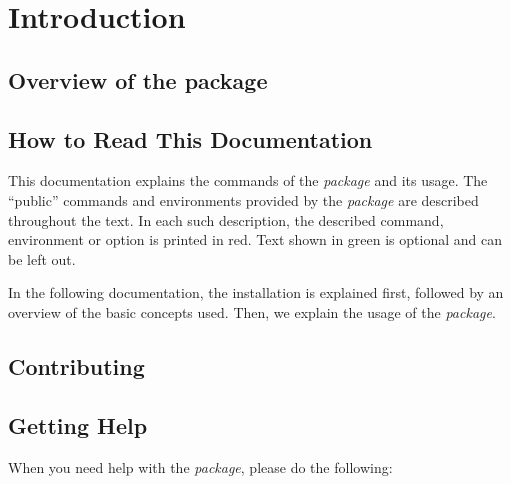 \documentclass{simurgh-doc}
\begin{document}
\clearpage








\maketitle


\tableofcontents

\clearpage


\section{Introduction}

\subsection{Overview of the package}

\subsection{How to Read This Documentation}

This documentation explains the commands of the \simurgh{} \textit{package} and its usage. The ``public'' commands and environments provided by the \simurgh{} \textit{package} are described throughout the text. In each such description, the described command, environment or option is printed in red. Text shown in green is optional and can be left out.

In the following documentation, the installation is explained first, followed by an overview of the basic concepts used. Then, we explain the usage of the \textit{package}.

\subsection{Contributing}

\subsection{Getting Help}

When you need help with the \textit{package}, please do the following:
\end{document}
